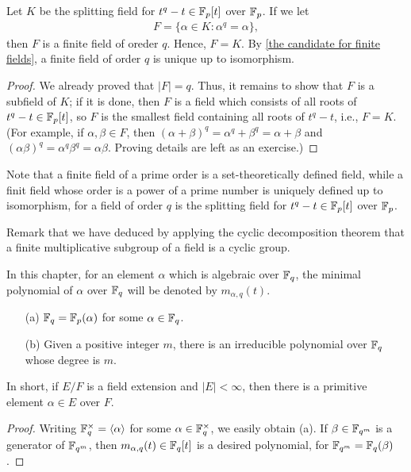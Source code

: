 \begin{thm}
    Let $K$ be the splitting field for $t^q-t\in{\mathbb{F}}_p[t]$ over ${\mathbb{F}}_p$.
    If we let
    \begin{align*}
        F=\{\alpha\in K: \alpha^q=\alpha\},
    \end{align*}
    then $F$ is a finite field of oreder $q$.
    Hence, $F=K$.
    By \cref{the candidate for finite fields}, a finite field of order $q$ is unique up to isomorphism.
\end{thm}
\begin{proof}
    We already proved that $|F|=q$.
    Thus, it remains to show that $F$ is a subfield of $K$; if it is done, then $F$ is a field which consists of all roots of $t^q-t\in{\mathbb{F}}_p[t]$, so $F$ is the smallest field containing all roots of $t^q-t$, i.e., $F=K$.
    (For example, if $\alpha, \beta\in F$, then $(\alpha+\beta)^q=\alpha^q+\beta^q=\alpha+\beta$ and $(\alpha\beta)^q=\alpha^q\beta^q=\alpha\beta$.
    \color{brown}Proving details are left as an exercise.\color{black})
\end{proof}
\begin{rmk}
    Note that a finite field of a prime order is a set-theoretically defined field, while a finit field whose order is a power of a prime number is uniquely defined up to isomorphism, for a field of order $q$ is the splitting field for $t^q-t\in{\mathbb{F}}_p[t]$ over ${\mathbb{F}}_p$.
\end{rmk}

Remark that we have deduced by applying the cyclic decomposition theorem that a finite multiplicative subgroup of a field is a cyclic group.
\begin{nota}
    In this chapter, for an element $\alpha$ which is algebraic over ${\mathbb{F}}_q$, the minimal polynomial of $\alpha$ over ${\mathbb{F}}_q$ will be denoted by $m_{\alpha, q}(t)$.
\end{nota}

\begin{prop}
    \begin{enumerate}
        \item[(a)]
        {
            ${\mathbb{F}}_q={\mathbb{F}}_p(\alpha)$ for some $\alpha\in{\mathbb{F}}_q$.
        }
        \item[(b)]
        {
            Given a positive integer $m$, there is an irreducible polynomial over ${\mathbb{F}}_q$ whose degree is $m$.
        }
    \end{enumerate}
    In short, if $E/F$ is a field extension and $|E|<\infty$, then there is a primitive element $\alpha\in E$ over $F$.
\end{prop}
\begin{proof}
    Writing ${\mathbb{F}}_q^\times={\left\langle{\alpha}\right\rangle}$ for some $\alpha\in{\mathbb{F}}_q^\times$, we easily obtain (a).
    If $\beta\in{\mathbb{F}}_{q^m}$ is a generator of ${\mathbb{F}}_{q^m}$, then $m_{\alpha, q}(t)\in{\mathbb{F}}_q[t]$ is a desired polynomial, for ${\mathbb{F}}_{q^m}={\mathbb{F}}_q(\beta)$.
\end{proof}

